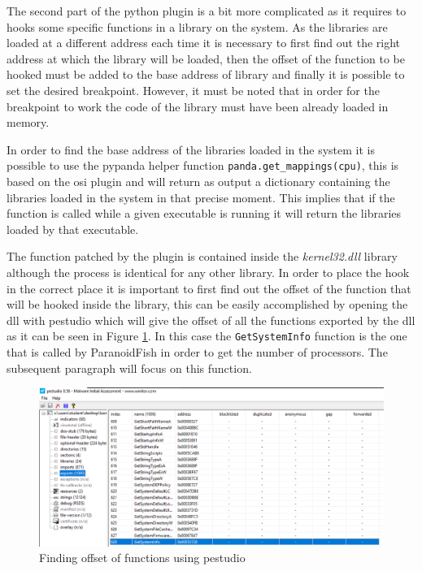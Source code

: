 The second part of the python plugin is a bit more complicated as it requires to hooks some specific functions in a library on the system. As the libraries are loaded at a different address each time it is necessary to first find out the right address at which the library will be loaded, then the offset of the function to be hooked must be added to the base address of library and finally it is possible to set the desired breakpoint. However, it must be noted that in order for the breakpoint to work the code of the library must have been already loaded in memory. 

In order to find the base address of the libraries loaded in the system it is possible to use the pypanda helper function \lstinline{panda.get_mappings(cpu)}, this is based on the osi plugin and will return as output a dictionary containing the 
libraries loaded in the system in that precise moment. This implies that if the function is called while a given executable is running it will return the libraries loaded by that executable. 

The function patched by the plugin is contained inside the \textit{kernel32.dll} library although the process is identical for any other library. In order to place the hook in the correct place it is important to first find out the offset of the function that will be hooked inside the library, this can be easily accomplished by opening the dll with pestudio which will give the offset of all the functions exported by the dll as it can be seen in Figure \ref{fig:pestudio}. In this case the \lstinline{GetSystemInfo} function is the one that is called by ParanoidFish in order to get the number of processors. The subsequent paragraph will focus on this function. 

\noindent
\begin{figure}[htp]
\centering
\includegraphics[width=\linewidth]{images/pestudio.png}
\caption{Finding offset of functions using pestudio}
\label{fig:pestudio}
\end{figure}

